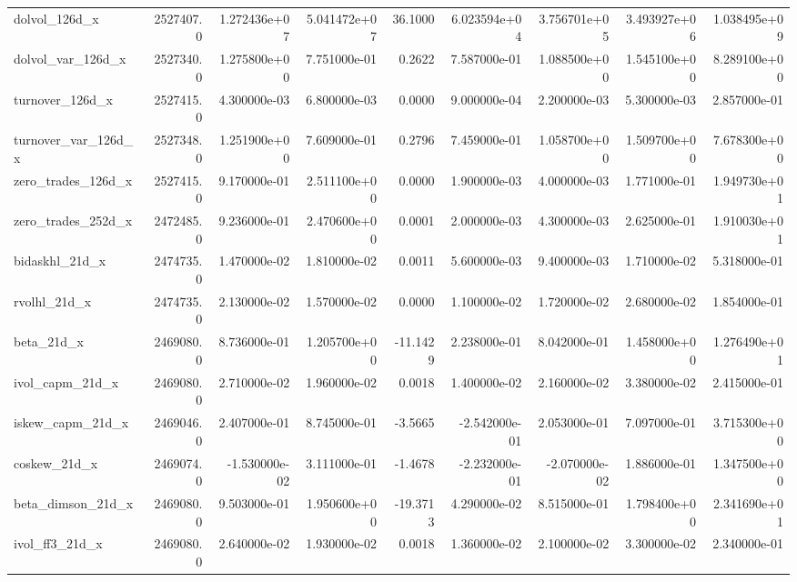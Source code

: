 \documentclass[10pt]{article}
\begin{document}
\begin{landscape}
\begin{longtable}{|l|r|r|r|r|r|r|r|r|}
dolvol\_126d\_x           &  2527407.0 &  1.272436e+07 &  5.041472e+07 &     36.1000 &  6.023594e+04 &  3.756701e+05 &  3.493927e+06 &  1.038495e+09 \\
dolvol\_var\_126d\_x       &  2527340.0 &  1.275800e+00 &  7.751000e-01 &      0.2622 &  7.587000e-01 &  1.088500e+00 &  1.545100e+00 &  8.289100e+00 \\
turnover\_126d\_x         &  2527415.0 &  4.300000e-03 &  6.800000e-03 &      0.0000 &  9.000000e-04 &  2.200000e-03 &  5.300000e-03 &  2.857000e-01 \\
turnover\_var\_126d\_x     &  2527348.0 &  1.251900e+00 &  7.609000e-01 &      0.2796 &  7.459000e-01 &  1.058700e+00 &  1.509700e+00 &  7.678300e+00 \\
zero\_trades\_126d\_x      &  2527415.0 &  9.170000e-01 &  2.511100e+00 &      0.0000 &  1.900000e-03 &  4.000000e-03 &  1.771000e-01 &  1.949730e+01 \\
zero\_trades\_252d\_x      &  2472485.0 &  9.236000e-01 &  2.470600e+00 &      0.0001 &  2.000000e-03 &  4.300000e-03 &  2.625000e-01 &  1.910030e+01 \\
bidaskhl\_21d\_x          &  2474735.0 &  1.470000e-02 &  1.810000e-02 &      0.0011 &  5.600000e-03 &  9.400000e-03 &  1.710000e-02 &  5.318000e-01 \\
rvolhl\_21d\_x            &  2474735.0 &  2.130000e-02 &  1.570000e-02 &      0.0000 &  1.100000e-02 &  1.720000e-02 &  2.680000e-02 &  1.854000e-01 \\
beta\_21d\_x              &  2469080.0 &  8.736000e-01 &  1.205700e+00 &    -11.1429 &  2.238000e-01 &  8.042000e-01 &  1.458000e+00 &  1.276490e+01 \\
ivol\_capm\_21d\_x         &  2469080.0 &  2.710000e-02 &  1.960000e-02 &      0.0018 &  1.400000e-02 &  2.160000e-02 &  3.380000e-02 &  2.415000e-01 \\
iskew\_capm\_21d\_x        &  2469046.0 &  2.407000e-01 &  8.745000e-01 &     -3.5665 & -2.542000e-01 &  2.053000e-01 &  7.097000e-01 &  3.715300e+00 \\
coskew\_21d\_x            &  2469074.0 & -1.530000e-02 &  3.111000e-01 &     -1.4678 & -2.232000e-01 & -2.070000e-02 &  1.886000e-01 &  1.347500e+00 \\
beta\_dimson\_21d\_x       &  2469080.0 &  9.503000e-01 &  1.950600e+00 &    -19.3713 &  4.290000e-02 &  8.515000e-01 &  1.798400e+00 &  2.341690e+01 \\
ivol\_ff3\_21d\_x          &  2469080.0 &  2.640000e-02 &  1.930000e-02 &      0.0018 &  1.360000e-02 &  2.100000e-02 &  3.300000e-02 &  2.340000e-01 \\

\end{longtable}
\end{landscape}
\end{document}
